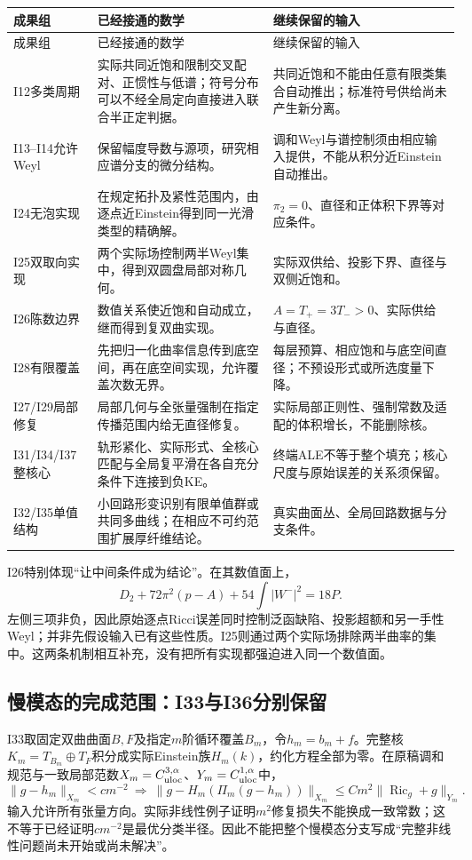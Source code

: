 \documentclass[UTF8,fontset=fandol,zihao=-4,a4paper]{ctexart}
\theoremstyle{remark}
\DeclareMathOperator{\Ric}{Ric}
\begin{document}
\begin{longtable}{L{24mm}L{76mm}L{47mm}}
\toprule 成果组 & 已经接通的数学 & 继续保留的输入 \\\midrule
\endfirsthead
\toprule 成果组 & 已经接通的数学 & 继续保留的输入 \\\midrule
\endhead
I12多类周期 & 实际共同近饱和限制交叉配对、正惯性与低谱；符号分布可以不经全局定向直接进入联合半正定判据。 & 共同近饱和不能由任意有限类集合自动推出；标准符号供给尚未产生新分离。 \\
I13--I14允许Weyl & 保留幅度导数与源项，研究相应谱分支的微分结构。 & 调和Weyl与谱控制须由相应输入提供，不能从积分近Einstein自动推出。 \\
I24无泡实现 & 在规定拓扑及紧性范围内，由逐点近Einstein得到同一光滑类型的精确解。 & $\pi_2=0$、直径和正体积下界等对应条件。 \\
I25双取向实现 & 两个实际场控制两半Weyl集中，得到双圆盘局部对称几何。 & 实际双供给、投影下界、直径与双侧近饱和。 \\
I26陈数边界 & 数值关系使近饱和自动成立，继而得到复双曲实现。 & $A=T_+=3T_->0$、实际供给与直径。 \\
I28有限覆盖 & 先把归一化曲率信息传到底空间，再在底空间实现，允许覆盖次数无界。 & 每层预算、相应饱和与底空间直径；不预设形式或所选度量下降。 \\
I27/I29局部修复 & 局部几何与全张量强制在指定传播范围内给无直径修复。 & 实际局部正则性、强制常数及适配的体积增长，不能删除核。 \\
I31/I34/I37整核心 & 轨形紧化、实际形式、全核心匹配与全局复平滑在各自充分条件下连接到负KE。 & 终端ALE不等于整个填充；核心尺度与原始误差的关系须保留。 \\
I32/I35单值结构 & 小回路形变识别有限单值群或共同多曲线；在相应不可约范围扩展厚纤维结论。 & 真实曲面丛、全局回路数据与分支条件。 \\
\bottomrule
\end{longtable}

I26特别体现“让中间条件成为结论”。在其数值面上，
\[
\boxed{D_2+72\pi^2(p-A)+54\int|W^-|^2=18P.}
\]
左侧三项非负，因此原始逐点Ricci误差同时控制泛函缺陷、投影超额和另一手性Weyl；并非先假设输入已有这些性质。I25则通过两个实际场排除两半曲率的集中。这两条机制相互补充，没有把所有实现都强迫进入同一个数值面。

\subsection{慢模态的完成范围：I33与I36分别保留}

I33取固定双曲曲面$B,F$及指定$m$阶循环覆盖$B_m$，令$h_m=b_m+f$。完整核$K_m=T_{B_m}\oplus T_F$积分成实际Einstein族$H_m(k)$，约化方程全部为零。在原稿调和规范与一致局部范数$X_m=C^{3,\alpha}_{\rm uloc}$、$Y_m=C^{1,\alpha}_{\rm uloc}$中，
\[
\|g-h_m\|_{X_m}<cm^{-2}
\ \Longrightarrow\
\|g-H_m(\Pi_m(g-h_m))\|_{X_m}
\le Cm^2\|\Ric_g+g\|_{Y_m}.
\]
输入允许所有张量方向。实际非线性例子证明$m^2$修复损失不能换成一致常数；这不等于已经证明$cm^{-2}$是最优分类半径。因此不能把整个慢模态分支写成“完整非线性问题尚未开始或尚未解决”。
\end{document}
